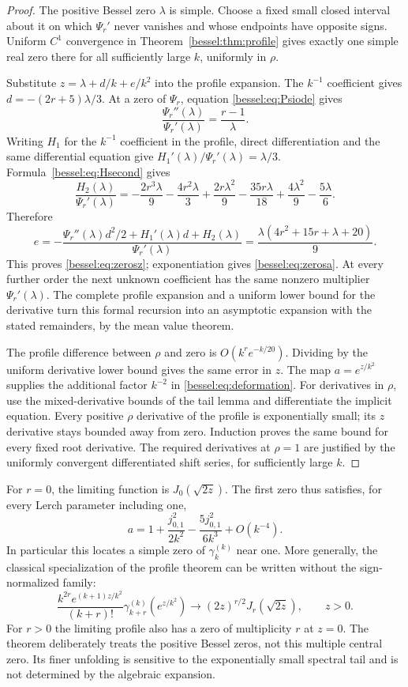 \begin{proof}
The positive Bessel zero $\lambda$ is simple. Choose a fixed small
closed interval about it on which $\Psi_r'$ never vanishes and
whose endpoints have opposite signs. Uniform $C^1$ convergence in
Theorem~\ref{bessel:thm:profile} gives exactly one simple real zero
there for all sufficiently large $k$, uniformly in $\rho$.

Substitute $z=\lambda+d/k+e/k^2$ into the profile expansion. The
$k^{-1}$ coefficient gives
$d=-(2r+5)\lambda/3$. At a zero of $\Psi_r$, equation
\eqref{bessel:eq:Psiode} gives
\[
 \frac{\Psi_r''(\lambda)}{\Psi_r'(\lambda)}
       =\frac{r-1}{\lambda}.
\]
Writing $H_1$ for the $k^{-1}$ coefficient in the profile, direct
differentiation and the same differential equation give
$H_1'(\lambda)/\Psi_r'(\lambda)=\lambda/3$.
Formula~\eqref{bessel:eq:Hsecond} gives
\[
 \frac{H_2(\lambda)}{\Psi_r'(\lambda)}
 =-\frac{2r^3\lambda}{9}-\frac{4r^2\lambda}{3}
   +\frac{2r\lambda^2}{9}-\frac{35r\lambda}{18}
   +\frac{4\lambda^2}{9}-\frac{5\lambda}{6}.
\]
Therefore
\[
 e=-\frac{\Psi_r''(\lambda)d^2/2
           +H_1'(\lambda)d+H_2(\lambda)}{\Psi_r'(\lambda)}
   =\frac{\lambda(4r^2+15r+\lambda+20)}9.
\]
This proves \eqref{bessel:eq:zerosz}; exponentiation gives
\eqref{bessel:eq:zerosa}. At every further order the next unknown
coefficient has the same nonzero multiplier $\Psi_r'(\lambda)$.
The complete profile expansion and a uniform lower bound for the
derivative turn this formal recursion into an asymptotic expansion
with the stated remainders, by the mean value theorem.

The profile difference between $\rho$ and zero is
$O(k^r e^{-k/20})$. Dividing by the uniform derivative lower bound
gives the same error in $z$. The map $a=e^{z/k^2}$ supplies the
additional factor $k^{-2}$ in \eqref{bessel:eq:deformation}.
For derivatives in $\rho$, use the mixed-derivative bounds of the
tail lemma and differentiate the implicit equation. Every positive
$\rho$ derivative of the profile is exponentially small; its
$z$ derivative stays bounded away from zero. Induction proves the
same bound for every fixed root derivative. The required derivatives
at $\rho=1$ are justified by the uniformly convergent differentiated
shift series, for sufficiently large $k$.
\end{proof}

For $r=0$, the limiting function is $J_0(\sqrt{2z})$. The first
zero thus satisfies, for every Lerch parameter including one,
\[
 a=1+\frac{j_{0,1}^2}{2k^2}
       -\frac{5j_{0,1}^2}{6k^3}+O(k^{-4}).
\]
In particular this locates a simple zero of $\gamma_k^{(k)}$ near
one. More generally, the classical specialization of the profile theorem
can be written without the sign-normalized family:
\[
 \frac{k^{2r}e^{(k+1)z/k^2}}{(k+r)!}
 \gamma_{k+r}^{(k)}(e^{z/k^2})
 \longrightarrow (2z)^{r/2}J_r(\sqrt{2z}),\qquad z>0.
\]
For $r>0$ the limiting profile also has a zero of multiplicity $r$
at $z=0$. The theorem deliberately treats the positive Bessel zeros,
not this multiple central zero. Its finer unfolding is sensitive to
the exponentially small spectral tail and is not determined by the
algebraic expansion.

